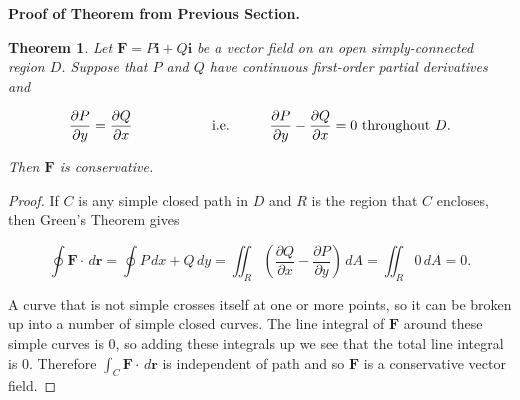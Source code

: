 \documentclass[11pt,oneside,english]{amsart}
\newtheorem{theorem}{Theorem}
\theoremstyle{definition}
\newcommand{\pspace}{\hspace{10mm}}
\newcommand{\pp}[2]{\frac{\partial{#1}}{\partial{#2}}}
\begin{document}
\pagebreak

\textbf{Proof of Theorem from Previous Section.}

\begin{theorem}
Let $\mathbf{F}=P\mathbf{i}+Q\mathbf{i}$ be a vector field on an open simply-connected region $D$. Suppose that $P$ and $Q$ have continuous first-order partial derivatives and 

\[
\pp{P}{y}=\pp{Q}{x}\pspace\pspace\text{i.e.}\pspace\pp{P}{y}-\pp{Q}{x}=0\text{ throughout $D$.}
\]

Then $\mathbf{F}$ is conservative.

\end{theorem}


\begin{proof}
If $C$ is any simple closed path in $D$ and $R$ is the region that $C$ encloses, then Green's Theorem gives

\[
\oint\mathbf{F}\cdot\,d\mathbf{r}=\oint P\,dx+Q\,dy=\iint_R\left(\pp{Q}{x}-\pp{P}{y}\right)\,dA=\iint_R0\,dA=0.
\]

A curve that is not simple crosses itself at one or more points, so it can be broken up into a number of simple closed curves. The line integral of $\mathbf{F}$ around these simple curves is 0, so adding these integrals up we see that the total line integral is 0. Therefore $\int_C\mathbf{F}\cdot\,d\mathbf{r}$ is independent of path and so $\mathbf{F}$ is a conservative vector field.
\end{proof}
\end{document}
